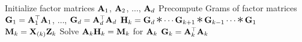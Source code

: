 
\begin{algorithmic}[1]\footnotesize
    
      \State Initialize factor matrices $\mathbf{A}_1$, $\mathbf{A}_2$, $\dots$, $\mathbf{A}_d$
      \State Precompute Grams of factor matrices $\mathbf{G}_1 = \mathbf{A}_1^\top \mathbf{A}_1$, $\dots$, $\mathbf{G}_d = \mathbf{A}_d^\top \mathbf{A}_d$  
              \State $\mat{H}_k = \mat{G}_d \hada \cdots \mat{G}_{k+1} \hada \mat{G}_{k-1} \cdots \hada \mat{G}_1$  \label{l:NE-Hada}
              \State $\mathbf{M}_k = \mathbf{X}_{(k)}\mathbf{Z}_k$  \label{l:NE-mttkrp}
              \State Solve $\mathbf{A}_k \mathbf{H}_k = \mathbf{M}_{k}$ for $\mathbf{A}_k$  \label{l:NE-solve}
              \State $\mathbf{G}_k = \mathbf{A}_k^\top\mathbf{A}_k$    \label{l:NE-Gram}
          \EndFor
      \EndWhile
    \EndFunction
    
  \end{algorithmic}